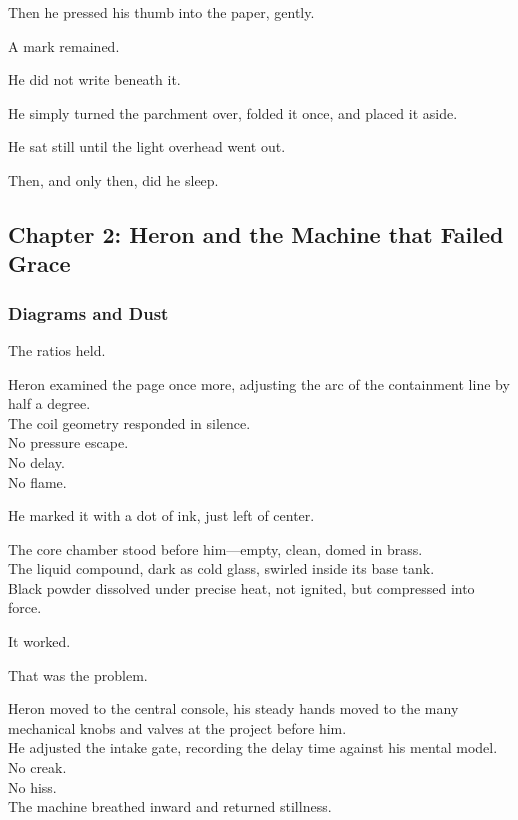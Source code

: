 \documentclass[12pt]{article}
\begin{document}
Then he pressed his thumb into the paper, gently.

A mark remained.

\vspace{1em}

He did not write beneath it.

He simply turned the parchment over, folded it once, and placed it aside.

He sat still until the light overhead went out.

Then, and only then, did he sleep.

\newpage

\subsection{Chapter 2: Heron and the Machine that Failed Grace}

\vspace{.5in}

\subsubsection{Diagrams and Dust}

The ratios held.

Heron examined the page once more, adjusting the arc of the containment line by half a degree.\\
The coil geometry responded in silence.\\
No pressure escape.\\
No delay.\\
No flame.

He marked it with a dot of ink, just left of center.

The core chamber stood before him—empty, clean, domed in brass.\\
The liquid compound, dark as cold glass, swirled inside its base tank.\\
Black powder dissolved under precise heat, not ignited, but compressed into force.

It worked.

That was the problem.

\vspace{1em}

Heron moved to the central console, his steady hands moved to the many mechanical knobs and valves at the project before him.\\
He adjusted the intake gate, recording the delay time against his mental model.\\
No creak.\\
No hiss.\\
The machine breathed inward and returned stillness.
\end{document}
